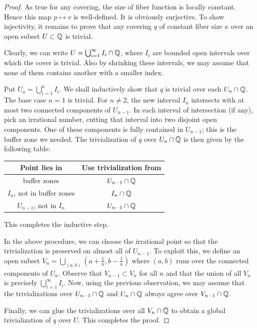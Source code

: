\documentclass{article}
\begin{document}
\begin{proof}
    As true for any covering, the size of fiber function is locally constant. Hence this map $p\mapsto v$ is well-defined. It is obviously surjective. To show injectivity, it remains to prove that any covering $q$ of constant fiber size $\kappa$ over an open subset $U\subset\mathbb{Q}$ is trivial. 

    Clearly, we can write $U=\bigcup_{i=1}^\infty I_i\cap\mathbb{Q}$, where $I_i$ are bounded open intervals over which the cover is trivial. Also by shrinking these intervals, we may assume that none of them contains another with a smaller index.

    Put $U_n=\bigcup_{i=1}^n I_i$. We shall inductively show that $q$ is trivial over each $U_n\cap\mathbb{Q}$. The base case $n=1$ is trivial. For $n\neq 2$, the new interval $I_n$ intersects with at most two connected components of $U_{n-1}$. In each interval of intersection (if any), pick an irrational number, cutting that interval into two disjoint open components. One of these components is fully contained in $U_{n-1}$; this is the buffer zone we needed. The trivialization of $q$ over $U_n\cap\mathbb{Q}$ is then given by the following table:
    \begin{center}
        \begin{tabular}{|c|c|}
            \hline
            Point lies in & Use trivialization from \\
            \hline
            buffer zones & $U_{n-1}\cap\mathbb{Q}$ \\
            $I_n$, not in buffer zones & $I_n\cap\mathbb{Q}$ \\
            $U_{n-1}$, not in $I_n$ & $U_{n-1}\cap\mathbb{Q}$ \\
            \hline
        \end{tabular}
    \end{center}
    This completes the inductive step. 

    In the above procedure, we can choose the irrational point so that the trivialization is preserved on almost all of $U_{n-1}$. To exploit this, we define an open subset $V_n=\bigcup_{(a,b)}(a+\frac{1}{n},b-\frac{1}{n})$ where $(a,b)$ runs over the connected components of $U_n$. Observe that $V_{n-1}\subset V_n$ for all $n$ and that the union of all $V_n$ is precisely $\bigcup_{i=1}^\infty I_i$. Now, using the previous observation, we may assume that the trivializations over $U_{n-1}\cap\mathbb{Q}$ and $U_{n}\cap\mathbb{Q}$ always agree over $V_{n-1}\cap\mathbb{Q}$.

    Finally, we can glue the trivializations over all $V_n\cap\mathbb{Q}$ to obtain a global trivialization of $q$ over $U$. This completes the proof.
\end{proof}
\end{document}
